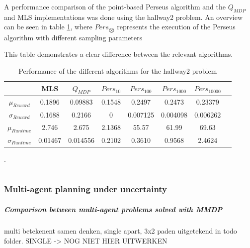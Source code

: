 \documentclass[10pt,a4paper]{article}
\begin{document}
A performance comparison of the point-based Perseus algorithm and the $Q_{MDP}$ and MLS implementations was done using the hallway2 problem.
An overview can be seen in table \ref{table:performance}, where $Pers_{\bigotimes}$ represents the execution of the Perseus algorithm with different sampling parameters

This table demonstrates a clear difference between the relevant algorithms. 

\begin{table}
\centering
\begin{tabular}{ c || c | c | c | c | c | c | c}
\hfill & MLS & $Q_{MDP}$ & $Pers_{10}$ & $Pers_{100}$ & $Pers_{1000}$ & $Pers_{10000}$ \\
\hline
$\mu_{Reward}$ & 0.1896 & 0.09883 & 0.1548 & 0.2497 &  0.2473 & 0.23379\\
$\sigma_{Reward}$ & 0.1688 & 0.2166 & 0 & 0.007125 & 0.004098 & 0.006262 \\
\hline \hline
$\mu_{Runtime}$  & 2.746 & 2.675 & 2.1368 &  55.57 & 61.99 & 69.63 \\
$\sigma_{Runtime}$  & 0.01467 & 0.014556 & 0.2102 & 0.3610 & 0.9568 & 2.4624 \\
\end{tabular}
\caption{Performance of the different algorithms for the hallway2 problem}
\label{table:performance}
\end{table}

.


\part{}


\section{Multi-agent planning under uncertainty}

\subsubsection*{Comparison between multi-agent problems solved with MMDP}
multi betekenent samen denken, single apart, 3x2 paden uitgetekend in todo folder. SINGLE -> NOG NIET HIER UITWERKEN
\end{document}
